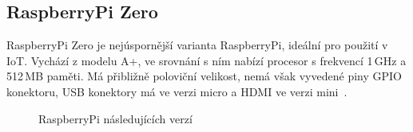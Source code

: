 \subsection{RaspberryPi Zero}
		RaspberryPi Zero je nejúspornější varianta RaspberryPi, ideální pro použití v IoT. Vychází z modelu A+, ve srovnání s ním nabízí procesor s frekvencí 1\,GHz a 512\,MB paměti. Má přibližně poloviční velikost, nemá však vyvedené piny GPIO konektoru, USB konektory má ve verzi micro a HDMI ve verzi mini~\cite{RaspiZero}.

\begin{figure}[!ht]
    \centering
			\hspace*{5mm}
			\hspace*{5mm}
		\caption{RaspberryPi následujících verzí}
		\vspace{-20pt}	
\end{figure}



